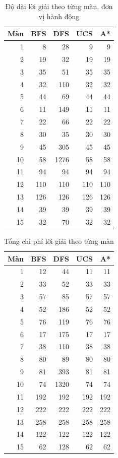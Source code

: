 \begin{table}[htbp]
\centering
\small
\caption{Độ dài lời giải theo từng màn, đơn vị hành động}
\begin{tabular}{|r|r|r|r|r|}
\hline
Màn & BFS & DFS & UCS & A* \\\hline
1  & 8   & 28   & 9   & 9   \\\hline
2  & 19  & 32   & 19  & 19  \\\hline
3  & 35  & 51   & 35  & 35  \\\hline
4  & 32  & 110  & 32  & 32  \\\hline
5  & 44  & 69   & 44  & 44  \\\hline
6  & 11  & 149  & 11  & 11  \\\hline
7  & 22  & 66   & 22  & 22  \\\hline
8  & 30  & 35   & 30  & 30  \\\hline
9  & 45  & 305  & 45  & 45  \\\hline
10 & 58  & 1276 & 58  & 58  \\\hline
11 & 94  & 94   & 94  & 94  \\\hline
12 & 110 & 110  & 110 & 110 \\\hline
13 & 126 & 126  & 126 & 126 \\\hline
14 & 39  & 39   & 39  & 39  \\\hline
15 & 32  & 70   & 32  & 32  \\\hline
\end{tabular}
\end{table}

\begin{table}[htbp]
\centering
\small
\caption{Tổng chi phí lời giải theo từng màn}
\begin{tabular}{|r|r|r|r|r|}
\hline
Màn & BFS & DFS & UCS & A* \\\hline
1  & 12  & 44   & 11  & 11  \\\hline
2  & 33  & 52   & 33  & 33  \\\hline
3  & 57  & 85   & 57  & 57  \\\hline
4  & 52  & 186  & 52  & 52  \\\hline
5  & 76  & 119  & 76  & 76  \\\hline
6  & 17  & 175  & 17  & 17  \\\hline
7  & 38  & 110  & 38  & 38  \\\hline
8  & 80  & 89   & 80  & 80  \\\hline
9  & 81  & 393  & 81  & 81  \\\hline
10 & 74  & 1320 & 74  & 74  \\\hline
11 & 192 & 192  & 192 & 192 \\\hline
12 & 222 & 222  & 222 & 222 \\\hline
13 & 258 & 258  & 258 & 258 \\\hline
14 & 122 & 122  & 122 & 122 \\\hline
15 & 62  & 128  & 62  & 62  \\\hline
\end{tabular}
\end{table}

